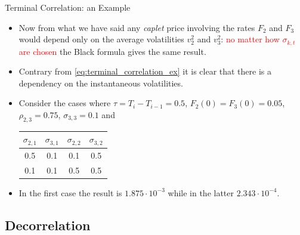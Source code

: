 \documentclass{beamer}
\begin{document}
\begin{frame}{Terminal Correlation: an Example}
\begin{itemize}
\item<1-> Now from what we have said any \emph{caplet} price involving the rates $F_2$ and $F_3$ would depend only on the average volatilities $v_2^2$ and $v_3^2$: \textcolor{red}{no matter how $\sigma_{k,t}$ are chosen} the Black formula gives the same result.
\item<2-> Contrary from \cref{eq:terminal_correlation_ex} it is clear that there is a dependency on the instantaneous volatilities.
\item<3-> Consider the cases where $\tau=T_i - T_{i-1}=0.5$, $F_2(0)=F_3(0)=0.05$, $\rho_{2,3}=0.75$, $\sigma_{3,3}=0.1$ and
\begin{center}
\begin{tabular}{|c|c|c|c|}
\hline
$\sigma_{2,1}$ & $\sigma_{3,1}$ & $\sigma_{2,2}$ & $\sigma_{3,2}$ \\ \hline
0.5 & 0.1 & 0.1 & 0.5 \\ \hline
0.1 & 0.1 & 0.5 & 0.5 \\ \hline
\end{tabular}
\end{center}
\item<3-> In the first case the result is $1.875\cdot10^{-3}$ while in the latter $2.343\cdot10^{-4}$.
\end{itemize}
\end{frame}

\subsection{Decorrelation}
\end{document}

